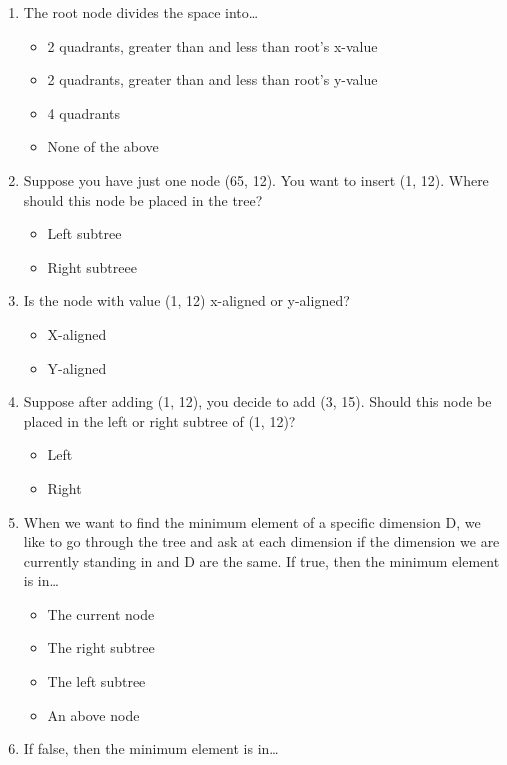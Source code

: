 \question



\begin{enumerate}
  \item The root node divides the space into…
  \begin{itemize}
     \item 2 quadrants, greater than and less than root's x-value
     \item 2 quadrants, greater than and less than root's y-value
     \item 4 quadrants
     \item None of the above
  \end{itemize}
  \item Suppose you have just one node (65, 12). You want to insert (1, 12). Where should this node be placed in the tree?
  \begin{itemize}
     \item Left subtree
     \item Right subtreee
  \end{itemize}
  \item Is the node with value (1, 12) x-aligned or y-aligned?
  \begin{itemize}
     \item X-aligned
     \item Y-aligned
  \end{itemize}
  \item Suppose after adding (1, 12), you decide to add (3, 15). Should this node be placed in the left or right subtree of (1, 12)?
  \begin{itemize}
     \item Left
     \item Right
  \end{itemize}
  \item When we want to find the minimum element of a specific dimension D, we like to go through the tree and ask at each dimension if the dimension we are currently standing in and D are the same. If true, then the minimum element is in…
  \begin{itemize}
     \item The current node
     \item The right subtree
     \item The left subtree
     \item An above node
   \end{itemize}
   \item If false, then the minimum element is in…
  \begin{itemize}

\end{itemize}
\end{enumerate}
